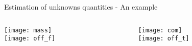 \begin{frame}{Estimation of unknowns quantities - An example}
  \vskip0.1in
  \begin{columns}
    \begin{column}{0.45\textwidth}
      \texttt{[image: mass]}\\
      \vskip0.1in
      \texttt{[image: off\_f]}
    \end{column}
    \begin{column}{0.45\textwidth}
      \texttt{[image: com]}\\
      \vskip0.1in
      \texttt{[image: off\_t]}
    \end{column}
  \end{columns}
\end{frame}

